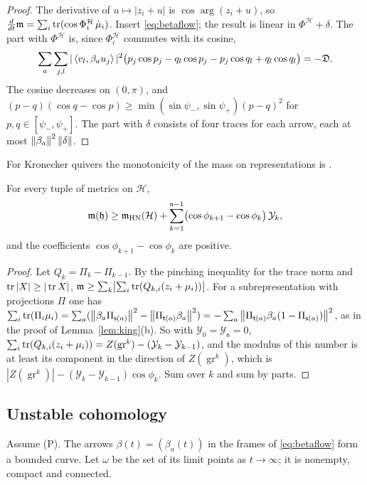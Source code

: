 \begin{proof}
The derivative of $u\mapsto|z_i+u|$ is $\cos\arg(z_i+u)$, so
$\frac d{dt}\mathfrak m=\sum_i\operatorname{tr}(\cos\Phi^{\mathcal H}_i\,\dot\mu_i)$. Insert
\eqref{eq:betaflow}; the result is linear in
$\Phi^{\mathcal H}+\delta$. The part with $\Phi^{\mathcal H}$ is, since
$\Phi^{\mathcal H}_i$ commutes with its cosine,
\[
 \sum_a\sum_{j,l}|\left\langle v_l,\beta_au_j\right\rangle|^2\bigl(p_j\cos p_j-q_l\cos p_j-p_j\cos q_l+q_l\cos q_l\bigr)=-\mathfrak D .
\]
The cosine decreases on $(0,\pi)$, and
$(p-q)(\cos q-\cos p)\geq\min(\sin\psi_-,\sin\psi_+)(p-q)^2$ for
$p,q\in[\psi_-,\psi_+]$. The part with $\delta$ consists of four traces for
each arrow, each at most $\left\lVert\beta_a\right\rVert^2\left\lVert\delta\right\rVert$.
\end{proof}

For Kronecker quivers the monotonicity of the mass on representations is
\cite[Proposition~9.1]{wue26b}.

\begin{proposition}\label{prop:hnmass}
For every tuple of metrics on $\mathcal H$,
\[
 \mathfrak m(\mathfrak h)\geq\mathfrak m_{\mathrm{HN}}(\mathcal H)
 +\sum_{k=1}^{\mathsf n-1}\bigl(\cos\phi_{k+1}-\cos\phi_k\bigr)\,\mathcal Y_k ,
\]
and the coefficients $\cos\phi_{k+1}-\cos\phi_k$ are positive.
\end{proposition}

\begin{proof}
Let $Q_k=\Pi_k-\Pi_{k-1}$. By the pinching inequality for the trace norm and
$\operatorname{tr}|X|\geq|\operatorname{tr} X|$,
$\mathfrak m\geq\sum_k\bigl|\sum_i\operatorname{tr}(Q_{k,i}(z_i+\mu_i))\bigr|$. For a
subrepresentation with projections $\Pi$ one has
$\sum_i\operatorname{tr}(\Pi_i\mu_i)=\sum_a(\left\lVert\beta_a\Pi_{\mathsf s(a)}\right\rVert^2-\left\lVert\Pi_{\mathsf t(a)}\beta_a\right\rVert^2)
=-\sum_a\left\lVert\Pi_{\mathsf t(a)}\beta_a(1-\Pi_{\mathsf s(a)})\right\rVert^2$, as in the
proof of Lemma~\ref{lem:king}(b). So with
$\mathcal Y_0=\mathcal Y_{\mathsf n}=0$,
$\sum_i\operatorname{tr}(Q_{k,i}(z_i+\mu_i))=Z(\operatorname{gr}^k)-(\mathcal Y_k-\mathcal Y_{k-1})$,
and the modulus of this number is at least its component in the direction of
$Z(\operatorname{gr}^k)$, which is
$|Z(\operatorname{gr}^k)|-(\mathcal Y_k-\mathcal Y_{k-1})\cos\phi_k$. Sum
over $k$ and sum by parts.
\end{proof}

\subsection{Unstable cohomology}
Assume (P). The arrows $\beta(t)=(\beta_a(t))$ in the frames of
\eqref{eq:betaflow} form a bounded curve. Let $\omega$ be the set of its
limit points as $t\to\infty$; it is nonempty, compact and connected.

